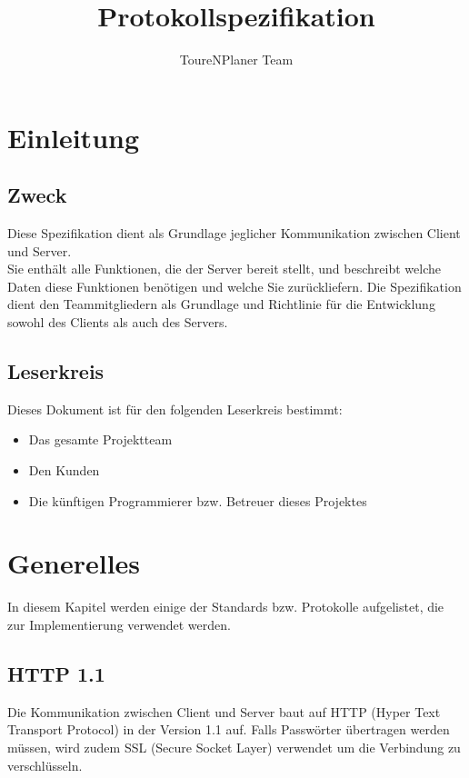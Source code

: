 \documentclass[ngerman]{scrartcl}
\title{Protokollspezifikation}
\author{ToureNPlaner Team}
\begin{document}
\maketitle

\tableofcontents

\pagebreak

\section{Einleitung}

	\subsection{Zweck}
	
	Diese Spezifikation dient als Grundlage jeglicher Kommunikation zwischen Client und Server.\\
	Sie enthält alle Funktionen, die der Server bereit stellt, und beschreibt welche Daten diese Funktionen benötigen und welche Sie zurückliefern. 
	Die Spezifikation dient den Teammitgliedern als Grundlage und Richtlinie für die Entwicklung sowohl des Clients als auch des Servers.
	
	\subsection{Leserkreis}
	
	Dieses Dokument ist für den folgenden Leserkreis bestimmt:
	
	\begin{itemize}
		\item Das gesamte Projektteam
		\item Den Kunden
		\item Die künftigen Programmierer bzw. Betreuer dieses Projektes
	\end{itemize}
	
\section{Generelles}

	In diesem Kapitel werden einige der Standards bzw. Protokolle aufgelistet, die zur Implementierung verwendet werden.

	\subsection{HTTP 1.1}

	Die Kommunikation zwischen Client und Server baut auf HTTP (Hyper Text Transport Protocol) in der Version 1.1 auf. 
	Falls Passwörter übertragen werden müssen, wird zudem SSL (Secure Socket Layer) verwendet um die Verbindung zu verschlüsseln.\\ 
	
\end{document}
